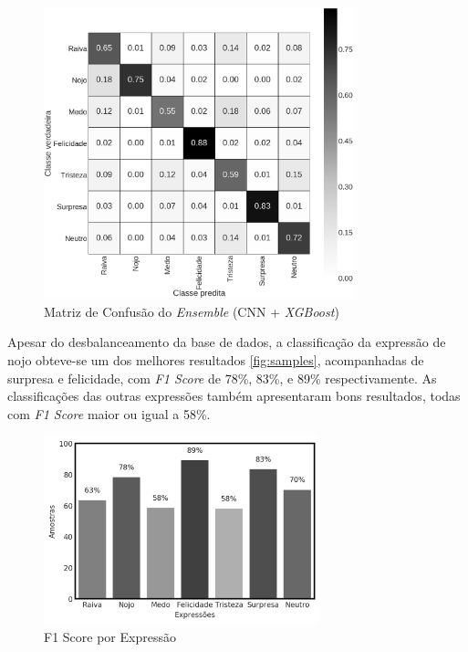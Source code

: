 \begin{figure}[!htb]
    \centering
    \includegraphics[width=9cm]{images/cm_emsemble.png}
    \caption{Matriz de Confusão do \emph{Ensemble} (CNN + \emph{XGBoost})}
    \label{fig:emsemble}
\end{figure}

Apesar do desbalanceamento da base de dados, a classificação da expressão de nojo obteve-se um dos melhores resultados \ref{fig:samples}, acompanhadas de surpresa e felicidade, com \textit{F1 Score} de
78\%, 83\%, e 89\% respectivamente. As classificações das outras expressões também apresentaram bons resultados, todas com \textit{F1 Score} maior ou igual a 58\%.

\begin{figure}[!htb]
    \centering
    \includegraphics[width=8cm]{images/f1_bar.png}
    \caption{F1 Score por Expressão}
    \label{fig:f1_bar}
\end{figure}
